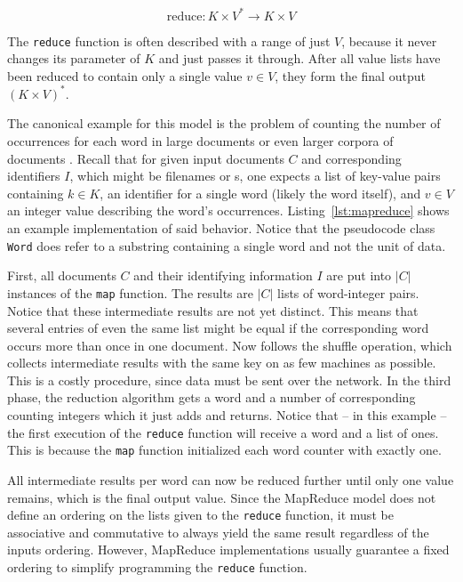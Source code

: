\[\text{reduce}: K\times{}V^*\rightarrow{}K\times{}V\]

The \lstinline|reduce| function is often described with a range of just $V$, because it never changes its parameter of $K$ and just passes it through. After all value lists have been reduced to contain only a single value $v\in{}V$, they form the final output $(K\times{}V)^*$.

The canonical example for this model is the problem of counting the number of occurrences for each word in large documents or even larger corpora of documents \cite{dean2008mapreduce}. Recall that for given input documents $C$ and corresponding identifiers $I$, which might be filenames or \URL{}s, one expects a list of key-value pairs containing $k\in{}K$, an identifier for a single word (likely the word itself), and $v\in{}V$ an integer value describing the word's occurrences. Listing~\ref{lst:mapreduce} shows an example implementation of said behavior. Notice that the pseudocode class \lstinline|Word| does refer to a substring containing a single word and not the unit of data.

First, all documents $C$ and their identifying information $I$ are put into $|C|$ instances of the \lstinline|map| function. The results are $|C|$ lists of word-integer pairs. Notice that these intermediate results are not yet distinct. This means that several entries of even the same list might be equal if the corresponding word occurs more than once in one document. Now follows the shuffle operation, which collects intermediate results with the same key on as few machines as possible. This is a costly procedure, since data must be sent over the network. In the third phase, the reduction algorithm gets a word and a number of corresponding counting integers which it just adds and returns. Notice that -- in this example -- the first execution of the \lstinline|reduce| function will receive a word and a list of ones. This is because the \lstinline|map| function initialized each word counter with exactly one.

All intermediate results per word can now be reduced further until only one value remains, which is the final output value. Since the MapReduce model does not define an ordering on the lists given to the \lstinline|reduce| function, it must be associative and commutative to always yield the same result regardless of the inputs ordering. However, MapReduce implementations usually guarantee a fixed ordering to simplify programming the \lstinline|reduce| function.

